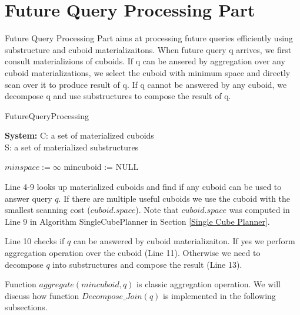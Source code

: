 \section{Future Query Processing Part}
\label{Future Query Processing Part}
Future Query Processing Part aims at processing future queries efficiently using substructure and cuboid materializaitons. When future query q arrives, we first consult materializions of cuboids. If q can be ansered by aggregation over any cuboid materializations, we select the cuboid with minimum space and directly scan over it to produce result of q. If q cannot be answered by any cuboid, we decompose q and use substructures to compose the result of q. 

\begin{algorithm}[H]
	\caption{FutureQueryProcessing}
	\LinesNumbered
	\textbf{System:} C: a set of materialized cuboids\\ S: a set of materialized substructures\\ 
	
	$minspace:= \infty $\;
	mincuboid := NULL \;
\end{algorithm}
\clearpage

Line 4-9 looks up materialized cuboids and find if any cuboid can be used to answer query $q$. If there are multiple useful cuboids we use the cuboid with the smallest scanning cost ($cuboid.space$). Note that $cuboid.space$ was computed in Line 9 in Algorithm SingleCubePlanner in Section \ref{Single Cube Planner}.

Line 10 checks if $q$ can be answered by cuboid materializaiton. If yes we perform aggregation operation over the cuboid (Line 11). Otherwise we need to decompose $q$ into substructures and compose the result (Line 13). 

Function $aggregate(mincuboid, q)$ is classic aggregation operation. We will discuss how function $Decompose\_Join(q)$ is implemented in the following subsections. 

